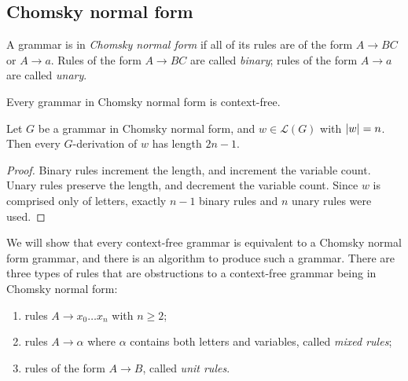 \subsection{Chomsky normal form}
\begin{definition}
	A grammar is in \emph{Chomsky normal form} if all of its rules are of the form \( A \to BC \) or \( A \to a \).
	Rules of the form \( A \to BC \) are called \emph{binary}; rules of the form \( A \to a \) are called \emph{unary}.
\end{definition}
Every grammar in Chomsky normal form is context-free.
\begin{lemma}
	Let \( G \) be a grammar in Chomsky normal form, and \( w \in \mathcal L(G) \) with \( \abs{w} = n \).
	Then every \( G \)-derivation of \( w \) has length \( 2n - 1 \).
\end{lemma}
\begin{proof}
	Binary rules increment the length, and increment the variable count.
	Unary rules preserve the length, and decrement the variable count.
	Since \( w \) is comprised only of letters, exactly \( n - 1 \) binary rules and \( n \) unary rules were used.
\end{proof}
We will show that every context-free grammar is equivalent to a Chomsky normal form grammar, and there is an algorithm to produce such a grammar.
There are three types of rules that are obstructions to a context-free grammar being in Chomsky normal form:
\begin{enumerate}
	\item rules \( A \to x_0 \dots x_n \) with \( n \geq 2 \);
	\item rules \( A \to \alpha \) where \( \alpha \) contains both letters and variables, called \emph{mixed rules};
	\item rules of the form \( A \to B \), called \emph{unit rules}.
\end{enumerate}
